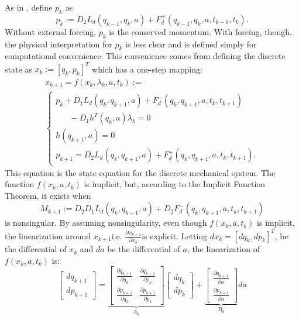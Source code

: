 \documentclass[letterpaper, 10pt, conference]{ieeeconf}
\begin{document}
As in \cite{johnson_murphey_scalable}, define $p_k$ as 
\begin{equation}
p_k := D_2 L_d(q_{k-1},q_{k},a) + F_d^+(q_{k-1},q_{k},a,t_{k-1},t_{k}).
\label{eq-pk}
\end{equation}
Without external forcing, $p_k$ is the conserved momentum.  With forcing, though, the physical interpretation for $p_k$ is less clear and is defined simply for computational convenience.  This convenience comes from defining the discrete state as $x_k := [q_k,p_k]^T$ which has a one-step mapping:
\begin{equation}
\begin{array}{l}
x_{k+1} = f(x_k,\lambda_k,a,t_k):=\\\left\{\begin{array}{l}
p_k + D_1L_d(q_k,q_{k+1},a) + F_d^-(q_k,q_{k+1},a,t_k,t_{k+1}) \\\hspace{20pt} - D_1h^T(q_k,a)\lambda_k= 0 \\
h(q_{k+1},a) = 0\\
p_{k+1} = D_2 L_d(q_{k},q_{k+1},a) + F_d^+(q_{k},q_{k+1},a,t_{k},t_{k+1}).
\end{array}\right.
\end{array}
\label{eq-fk}
\end{equation}
This equation is the state equation for the discrete mechanical system.  The function $f(x_k,a,t_k)$ is implicit, but, according to the Implicit Function Theorem, it exists when
\[
M_{k+1}:=D_2D_1L_d(q_k,q_{k+1},a) + D_2F_d^-(q_k,q_{k+1},a,t_k,t_{k+1})
\]
is nonsingular.  By assuming nonsingularity, even though $f(x_k,a,t_k)$ is implicit, the linearization around $x_{k+1}$\textemdash i.e. $\frac{\partial x_{k+1}}{\partial x_k}$\textemdash is explicit.  Letting $dx_k = [dq_k,dp_k]^T$, be the differential of $x_k$ and $da$ be the differential of $a$, the linearization of $f(x_k,a,t_k)$ is:
\begin{equation}
\left[\begin{array}{cc}dq_{k+1} \\ dp_{k+1} \end{array}\right]
 = \underbrace{\left[\begin{array}{cc}
\frac{\partial q_{k+1}}{\partial q_k} & \frac{\partial q_{k+1}}{\partial p_k} \\
\frac{\partial p_{k+1}}{\partial q_k} & \frac{\partial p_{k+1}}{\partial p_k} 
\end{array}\right]}_{A_k}
\left[\begin{array}{cc}dq_{k} \\ dp_k \end{array}\right] + \underbrace{\left[\begin{array}{cc}\frac{\partial q_{k+1}}{\partial a} \\ \frac{\partial p_{k+1}}{\partial a} \end{array}\right]}_{B_k}da
\label{eq-lin_fk}
\end{equation}
\end{document}
